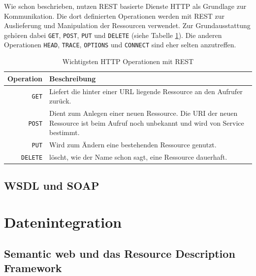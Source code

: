 \medskip

Wie schon beschrieben, nutzen REST basierte Dienste HTTP als Grundlage zur Kommunikation. Die dort definierten Operationen werden mit REST zur Auslieferung und Manipulation der Ressourcen verwendet. Zur Grundausstattung  gehören dabei \texttt{GET}, \texttt{POST}, \texttt{PUT} und \texttt{DELETE} (siehe Tabelle \ref{tbl:rest_oprations}). Die anderen Operationen \texttt{HEAD}, \texttt{TRACE}, \texttt{OPTIONS} und \texttt{CONNECT} sind eher selten anzutreffen.

\begin{table}[ht]
\centering
\caption{Wichtigsten HTTP Operationen mit REST} 
\begin{tabular}{r|p{12cm}}
    \textbf{Operation} & 
    \textbf{Beschreibung} \\ 
    \hline
    \texttt{GET} & 
    Liefert die hinter einer URL liegende Ressource an den Aufrufer zurück.\\
    
    \texttt{POST} & 
    Dient zum Anlegen einer neuen Ressource. Die URI der neuen Ressource ist beim Aufruf noch unbekannt und wird von Service bestimmt. \\

    \texttt{PUT} & 
    Wird zum Ändern eine bestehenden Ressource genutzt. \\
    
    \texttt{DELETE} &
    löscht, wie der Name schon sagt, eine Ressource dauerhaft.
\end{tabular}
\label{tbl:rest_oprations}
\end{table}      


\subsection{WSDL und SOAP} %
\label{sub:wsdl_und_soap}



\section{Datenintegration} %
\label{sec:datenintegration}



\subsection{Semantic web und das Resource Description Framework} %
\label{sub:semantic_web_und_das_resource_description_framework}



